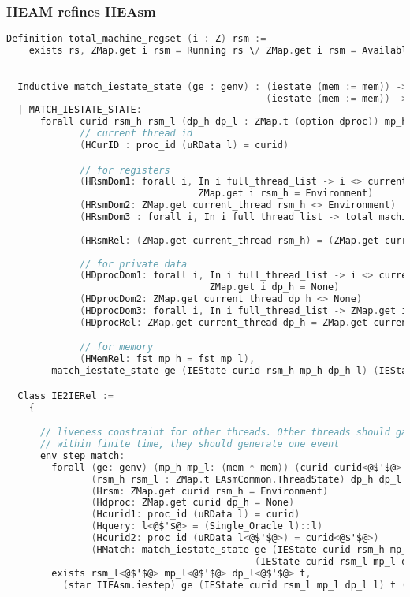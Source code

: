 \subsubsection{IIEAM refines IIEAsm}

\begin{lstlisting}[language=C]
  Definition total_machine_regset (i : Z) rsm :=
    exists rs, ZMap.get i rsm = Running rs \/ ZMap.get i rsm = Available.  
\end{lstlisting}


\begin{lstlisting}[language=C]

  Inductive match_iestate_state (ge : genv) : (iestate (mem := mem)) -> 
                                              (iestate (mem := mem)) -> Prop :=  
  | MATCH_IESTATE_STATE:
      forall curid rsm_h rsm_l (dp_h dp_l : ZMap.t (option dproc)) mp_h mp_l l
             // current thread id
             (HCurID : proc_id (uRData l) = curid)

             // for registers 
             (HRsmDom1: forall i, In i full_thread_list -> i <> current_thread ->
                                  ZMap.get i rsm_h = Environment)
             (HRsmDom2: ZMap.get current_thread rsm_h <> Environment)
             (HRsmDom3 : forall i, In i full_thread_list -> total_machine_regset i rsm_l)
             
             (HRsmRel: (ZMap.get current_thread rsm_h) = (ZMap.get current_thread rsm_l))
             
             // for private data 
             (HDprocDom1: forall i, In i full_thread_list -> i <> current_thread ->
                                    ZMap.get i dp_h = None)
             (HDprocDom2: ZMap.get current_thread dp_h <> None)
             (HDprocDom3: forall i, In i full_thread_list -> ZMap.get i dp_l <> None)
             (HDprocRel: ZMap.get current_thread dp_h = ZMap.get current_thread dp_l)

             // for memory 
             (HMemRel: fst mp_h = fst mp_l),
        match_iestate_state ge (IEState curid rsm_h mp_h dp_h l) (IEState curid rsm_l mp_l dp_l l).

  Class IE2IERel :=
    {

      // liveness constraint for other threads. Other threads should gaurantee this property -
      // within finite time, they should generate one event 
      env_step_match:
        forall (ge: genv) (mp_h mp_l: (mem * mem)) (curid curid<@$'$@>: Z)
               (rsm_h rsm_l : ZMap.t EAsmCommon.ThreadState) dp_h dp_l (l l<@$'$@> : Log)
               (Hrsm: ZMap.get curid rsm_h = Environment)
               (Hdproc: ZMap.get curid dp_h = None)
               (Hcurid1: proc_id (uRData l) = curid)
               (Hquery: l<@$'$@> = (Single_Oracle l)::l)
               (Hcurid2: proc_id (uRData l<@$'$@>) = curid<@$'$@>)
               (HMatch: match_iestate_state ge (IEState curid rsm_h mp_h dp_h l) 
                                            (IEState curid rsm_l mp_l dp_l l)),
        exists rsm_l<@$'$@> mp_l<@$'$@> dp_l<@$'$@> t,
          (star IIEAsm.iestep) ge (IEState curid rsm_l mp_l dp_l l) t (IEState curid<@$'$@> rsm_l<@$'$@> mp_l<@$'$@> dp_l<@$'$@> l<@$'$@>);



\end{lstlisting}
